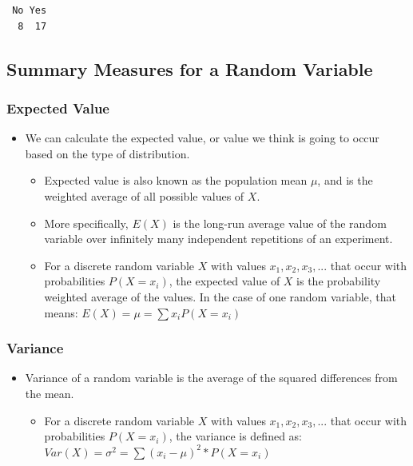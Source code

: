 \documentclass[
  letterpaper,
  DIV=11,
  numbers=noendperiod]{scrreprt}
\providecommand{\tightlist}{%
  \setlength{\itemsep}{0pt}\setlength{\parskip}{0pt}}\usepackage{longtable,booktabs,array}
\begin{document}
\begin{verbatim}
 No Yes 
  8  17 
\end{verbatim}

\subsection{Summary Measures for a Random
Variable}\label{summary-measures-for-a-random-variable}

\subsubsection{Expected Value}\label{expected-value}

\begin{itemize}
\tightlist
\item
  We can calculate the expected value, or value we think is going to
  occur based on the type of distribution.

  \begin{itemize}
  \tightlist
  \item
    Expected value is also known as the population mean \(\mu\), and is
    the weighted average of all possible values of \(X\).
  \item
    More specifically, \(E(X)\) is the long-run average value of the
    random variable over infinitely many independent repetitions of an
    experiment.
  \item
    For a discrete random variable \(X\) with values
    \(x_1, x_2, x_3, ...\) that occur with probabilities \(P(X=x_i)\),
    the expected value of \(X\) is the probability weighted average of
    the values. In the case of one random variable, that means:
    \(E(X) = \mu = \sum{x_iP(X=x_i)}\)
  \end{itemize}
\end{itemize}

\subsubsection{Variance}\label{variance}

\begin{itemize}
\tightlist
\item
  Variance of a random variable is the average of the squared
  differences from the mean.

  \begin{itemize}
  \tightlist
  \item
    For a discrete random variable \(X\) with values
    \(x_1, x_2, x_3, ...\) that occur with probabilities \(P(X=x_i)\),
    the variance is defined as:
    \(Var(X) = \sigma^2 = \sum{(x_i-\mu)^2*P(X=x_i)}\)
  \end{itemize}
\end{itemize}
\end{document}
